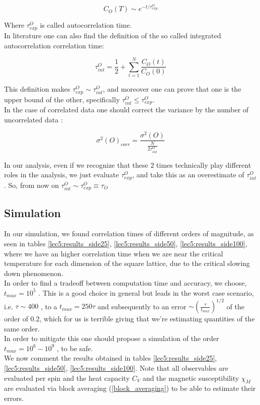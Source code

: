 $$ C_O(T) \sim e^{-t/\tau^O_{exp}} $$

Where $\tau^O_{exp}$ is called autocorrelation time. \\
In literature \cite{Weigel-2010} one can also find the definition of the so called integrated autocorrelation correlation time:

$$ \tau^O_{int} = \frac{1}{2} + \sum_{t=1}^N \frac{C_O(t)}{C_O(0)} $$

This definition makes $\tau^O_{exp} \sim \tau^O_{int}$, and moreover one can prove \cite{Weigel-2010} that one is the upper bound of the other, specifically $\tau^O_{int} \leq \tau^O_{exp}$. \\
In the case of correlated data one should correct the variance by the number of uncorrelated data \cite{Weigel-2010} :

$$ \sigma^2(O)_{corr} = \frac{\sigma^2(O)}{\frac{N}{2 \tau_{int}^O}} $$

In our analysis, even if we recognize that these 2 times technically play different roles in the analysis, we just evaluate $\tau^O_{exp}$, and take this as an overestimate of $\tau^O_{int}$. So, from now on $\tau^O_{int} \sim \tau^O_{exp} \equiv \tau_{O}$

\subsection{Simulation}

In our simulation, we found correlation times of different orders of magnitude, as seen in tables \ref{lec5:results_side25}, \ref{lec5:results_side50}, \ref{lec5:results_side100}, where 
we have an higher correlation time when we are near the critical temperature for each dimension of the square lattice, due to the critical slowing down phenomenon. \\
In order to find a tradeoff between computation time and accuracy, we choose, $t_{max} = 10^5$ . This is a good choice in general but leads in the worst case scenario, i.e. $\tau \sim 400$ , to 
a $t_{max} = 250 \tau$ and subsequently to an error $\sim (\frac{\tau}{t_{max}})^{1/2}$ of the order of $0.2$, which for us is terrible giving that we're estimating quantities of 
the same order. \\
In order to mitigate this one should propose a simulation of the order $t_{max} = 10^6 - 10^9$ , to be safe. \\

We now comment the results obtained in tables \ref{lec5:results_side25}, \ref{lec5:results_side50}, \ref{lec5:results_side100}. Note that all observables are evaluated 
per spin and the heat capacity $C_V$ and the magnetic susceptibility $\chi_M$ are evaluated via block averaging (\ref{block_averaging}) to be able to estimate their errors. 

